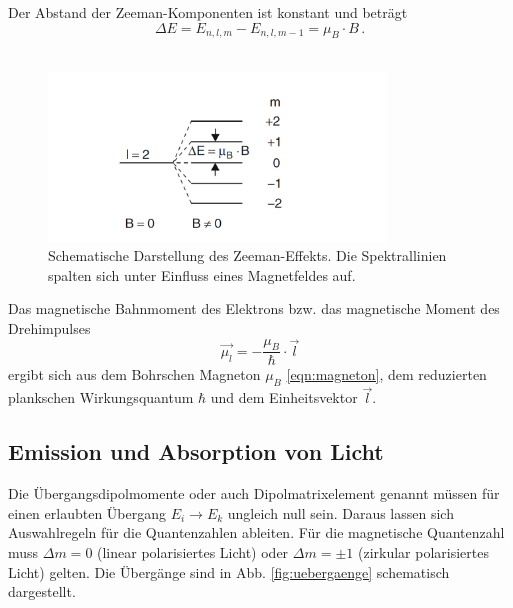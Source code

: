 Der Abstand der Zeeman-Komponenten ist konstant und beträgt
\begin{equation}
    \Delta E = E_{n,l,m} - E_{n,l,m-1} = \mu_B \cdot B \, .
    \label{eqn:energie_dif_normal}
\end{equation}
\\
\begin{figure}
    \centering
    \includegraphics[width=0.8\textwidth]{content/data/zeeman_aufspaltung.png}
    \caption{Schematische Darstellung des Zeeman-Effekts. Die Spektrallinien spalten sich unter Einfluss eines Magnetfeldes auf.} %
    \label{fig:zeeman_aufspaltung}
\end{figure}

Das magnetische Bahnmoment des Elektrons bzw. das magnetische Moment des Drehimpulses
\begin{equation}
    \vec{\mu_l} = -\frac{\mu_B}{\hbar} \cdot \vec{l}
    \label{eqn:magn_moment_l}
\end{equation}
ergibt sich aus dem Bohrschen Magneton $\mu_B$ \eqref{eqn:magneton}, dem reduzierten plankschen Wirkungsquantum $\hbar$ und dem Einheitsvektor $\vec{l}$.
 
\subsection{Emission und Absorption von Licht}
Die Übergangsdipolmomente oder auch Dipolmatrixelement genannt müssen für einen erlaubten Übergang $E_i \rightarrow E_k$ ungleich null sein.
Daraus lassen sich Auswahlregeln für die Quantenzahlen ableiten.
Für die magnetische Quantenzahl muss $\Delta m = 0$ (linear polarisiertes Licht) oder $\Delta m = \pm 1$ (zirkular polarisiertes Licht) gelten.
Die Übergänge sind in Abb. \ref{fig:uebergaenge} schematisch dargestellt.

